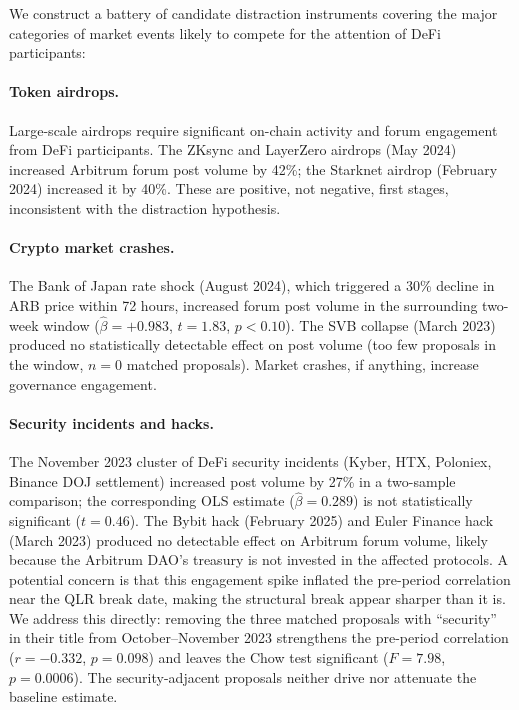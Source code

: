 \documentclass[12pt]{article}
\begin{document}
We construct a battery of candidate distraction instruments covering the major
categories of market events likely to compete for the attention of DeFi participants:

\paragraph{Token airdrops.}
Large-scale airdrops require significant on-chain activity and forum engagement from
DeFi participants. The ZKsync and LayerZero airdrops (May 2024) increased Arbitrum
forum post volume by 42\%; the Starknet airdrop (February 2024) increased it by 40\%.
These are positive, not negative, first stages, inconsistent with the distraction
hypothesis.

\paragraph{Crypto market crashes.}
The Bank of Japan rate shock (August 2024), which triggered a 30\% decline in ARB
price within 72 hours, increased forum post volume in the surrounding
two-week window ($\hat{\beta} = +0.983$, $t = 1.83$, $p < 0.10$). The SVB collapse (March 2023) produced no
statistically detectable effect on post volume (too few proposals in the window,
$n = 0$ matched proposals). Market crashes, if anything, increase governance
engagement.

\paragraph{Security incidents and hacks.}
The November 2023 cluster of DeFi security incidents (Kyber, HTX, Poloniex, Binance
DOJ settlement) increased post volume by 27\% in a two-sample comparison; the
corresponding OLS estimate ($\hat{\beta}=0.289$) is not statistically significant
($t=0.46$). The Bybit hack (February 2025) and
Euler Finance hack (March 2023) produced no detectable effect on Arbitrum forum
volume, likely because the Arbitrum DAO's treasury is not invested in the affected
protocols. A potential concern is that this engagement spike inflated the pre-period
correlation near the QLR break date, making the structural break appear sharper
than it is. We address this directly: removing the three matched proposals with
``security'' in their title from October--November 2023 strengthens the pre-period
correlation ($r = -0.332$, $p = 0.098$) and leaves the Chow test significant
($F = 7.98$, $p = 0.0006$). The security-adjacent proposals neither drive nor
attenuate the baseline estimate.
\end{document}
